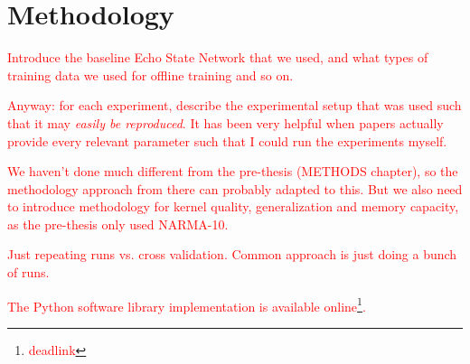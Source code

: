 \chapter{Methodology}

\textcolor{red}{
  Introduce the baseline Echo State Network that we used, and what types of
training data we used for offline training and so on.
}

\textcolor{red}{
  Anyway: for each experiment, describe the experimental setup that was used
such that it may \textit{easily be reproduced}. It has been very helpful when
papers actually provide every relevant parameter such that I could run the
experiments myself.
}

\textcolor{red}{
  We haven't done much different from the pre-thesis (METHODS chapter), so the
methodology approach from there can probably adapted to this. But we also need
to introduce methodology for kernel quality, generalization and memory capacity,
as the pre-thesis only used NARMA-10.
}

\textcolor{red}{
  Just repeating runs vs. cross validation. Common approach is just doing a
bunch of runs.
}

\textcolor{red}{
  The Python software library implementation is available
online\footnote{\textcolor{red}{deadlink}}.
}


